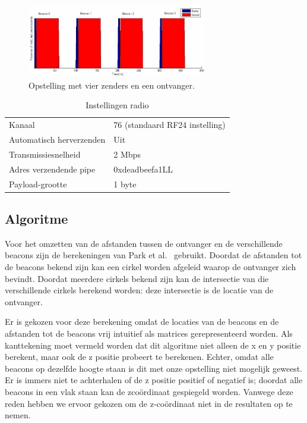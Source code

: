 \documentclass[a4paper,10pt]{article}
\begin{document}
\begin{figure}[ht!]
    \centering
    \includegraphics[width=0.7\textwidth]{tijdsdiagram_handleiding.png}
    \caption{Opstelling met vier zenders en een ontvanger.}
    \label{fig:tijdsdiagram_handleiding}
\end{figure}

\begin{table}[h]
    \begin{minipage}{\textwidth}
        \begin{tabular}{ l l }
            Kanaal                    & 76 (standaard RF24 instelling) \\
            Automatisch herverzenden  & Uit               \\
            Transmissiesnelheid       & 2 Mbps            \\
            Adres verzendende pipe    & 0xdeadbeefa1LL    \\
            Payload-grootte           & 1 byte
        \end{tabular}
        \caption{Instellingen radio}
        \label{table:instellingen}        
    \end{minipage}
\end{table}

\subsection{Algoritme}
Voor het omzetten van de afstanden tussen de ontvanger en de verschillende beacons zijn de berekeningen van Park et al.~\cite{park2011beacon} gebruikt. Doordat de afstanden tot de beacons bekend zijn kan een cirkel worden afgeleid waarop de ontvanger zich bevindt. Doordat meerdere cirkels bekend zijn kan de intersectie van die verschillende cirkels berekend worden: deze intersectie is de locatie van de ontvanger.

Er is gekozen voor deze berekening omdat de locaties van de beacons en de afstanden tot de beacons vrij intuitief als matrices gerepresenteerd worden. Als kanttekening moet vermeld worden dat dit algoritme niet alleen de x en y positie berekent, maar ook de z positie probeert te berekenen. Echter, omdat alle beacons op dezelfde hoogte staan is dit met onze opstelling niet mogelijk geweest. Er is immers niet te achterhalen of de z positie positief of negatief is; doordat alle beacons in een vlak staan kan de zco\"ordinaat gespiegeld worden. Vanwege deze reden hebben we ervoor gekozen om de z-co\"ordinaat niet in de resultaten op te nemen.
\end{document}
